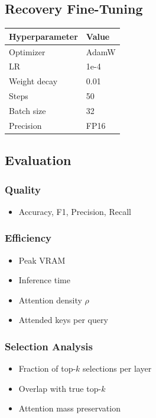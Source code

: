 \subsection{Recovery Fine-Tuning}

\begin{table}[H]
\centering
\small
\begin{tabular}{ll}
\toprule
\textbf{Hyperparameter} & \textbf{Value} \\
\midrule
Optimizer & AdamW \\
LR & 1e-4 \\
Weight decay & 0.01 \\
Steps & 50 \\
Batch size & 32 \\
Precision & FP16 \\
\bottomrule
\end{tabular}
\end{table}

\subsection{Evaluation}

\subsubsection{Quality}
\begin{itemize}
\item Accuracy, F1, Precision, Recall

\end{itemize}
\subsubsection{Efficiency}
\begin{itemize}
\item Peak VRAM
\item Inference time
\item Attention density $\rho$
\item Attended keys per query

\end{itemize}
\subsubsection{Selection Analysis}
\begin{itemize}
\item Fraction of top-$k$ selections per layer
\item Overlap with true top-$k$
\item Attention mass preservation

\end{itemize}
